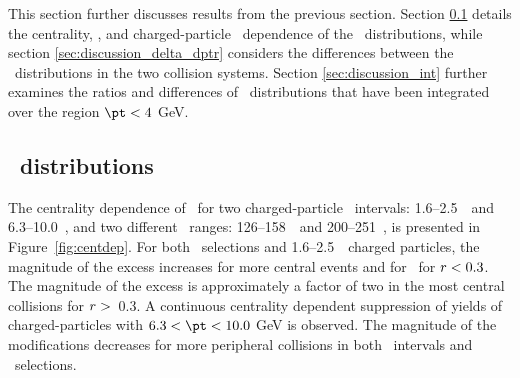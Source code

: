 
This section further discusses results from the previous section. Section \ref{sec:discussion_Rdptr} details the centrality, \ptjet, and charged-particle \pt\ dependence of the \RDptr\ distributions, while section \ref{sec:discussion_delta_dptr} considers the differences between the \Dptr\ distributions in the two collision systems. Section \ref{sec:discussion_int} further examines the ratios and differences of \Dptr\ distributions that have been integrated over the region $\pt < 4$ GeV.

\subsection{\RDptr\ distributions}
\label{sec:discussion_Rdptr}

The centrality dependence of \RDptr\ for two charged-particle \pt\ intervals: 1.6--2.5~\GeV\ and \mbox{6.3--10.0~\GeV}, and two different \ptjet\ ranges: 126--158~\GeV\ and 200--251~\GeV, is presented in Figure~\ref{fig:centdep}. 
For both \ptjet\ selections and  1.6--2.5~\GeV\ charged particles, the magnitude of the excess increases
for more central events and for \rvar\ for $\mbox{$r$} < 0.3$.  The magnitude of the excess is
approximately a factor of two in the most central collisions for $\mbox{$r$} >$~0.3.
A continuous centrality dependent suppression of  yields of charged-particles with $6.3 < \pt < 10.0$ GeV is observed.
The magnitude of the modifications decreases for more peripheral collisions in both \pt\ 
intervals and \ptjet\ selections.

